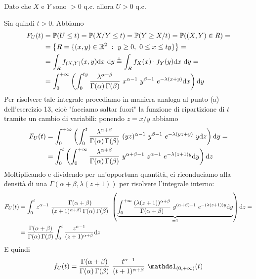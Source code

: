 \Soluzione{}
Dato che $X$ e $Y$ sono $>0$ q.c. allora $U>0$ q.c. 

Sia quindi $t>0$. Abbiamo
\begin{gather*}
\begin{aligned}
F_U(t)&=\PP(U\leq t)=\PP(X/Y\leq t)=\PP(Y\geq X/t)=\PP((X,Y)\in R)=\\
&=\left\{ R=\{(x,y)\in\RR^2\ :\ y\geq 0,\ 0\leq x\leq ty \} \right\}=\\
&=\int_R \fXYxy\dxy\overset{\underset{\indep}{}}{=}\int_R f_X(x)\cdot f_Y(y)\dxy=\\
&=\int_0^{+\infty}\left(\int_0^{ty}\frac{\lambda^{\alpha+\beta}}{\Gamma(\alpha)\,\Gamma(\beta)}\ x^{\alpha-1}\ y^{\beta-1}\ e^{-\lambda(x+y)}\dx\right)\dy
\end{aligned}
\end{gather*}
Per risolvere tale integrale procediamo in maniera analoga al punto (a) dell'esercizio 13, cioè "facciamo saltar fuori" la funzione di ripartizione di $t$ tramite un cambio di variabili: ponendo $z=x/y$ abbiamo
\begin{gather*}
\begin{aligned}
F_U(t)&=\int_0^{+\infty}\left(\int_0^{t}\frac{\lambda^{\alpha+\beta}}{\Gamma(\alpha)\,\Gamma(\beta)}\ (yz)^{\alpha-1}\ y^{\beta-1}\ e^{-\lambda(yz+y)}\ y\dz\right)\dy= \\
&=\int_0^t\left (\int_0^{+\infty}\frac{\lambda^{\alpha+\beta}}{\Gamma(\alpha)\,\Gamma(\beta)}\ y^{\alpha+\beta-1}\ z^{\alpha-1}\ e^{-\lambda(z+1)y}\dy\right)\dz
\end{aligned}
\end{gather*}
Moltiplicando e dividendo per un'opportuna quantità, ci riconduciamo alla densità di una $\Gamma(\alpha+\beta,\lambda(z+1))$ per risolvere l'integrale interno:
\begin{gather*}
\begin{aligned}
F_U(t)&=\int_0^t z^{\alpha-1}\ \frac{\Gamma(\alpha+\beta)}{(z+1)^{\alpha+\beta)}\,\Gamma(\alpha)\,\Gamma(\beta)}\ \left (\underbrace{\int_0^{+\infty}\frac{(\lambda(z+1))^{\alpha+\beta}}{\Gamma(\alpha+\beta)}\ y^{(\alpha+\beta)-1}\ e^{-(\lambda(z+1))y}\dy}_{=1}\right)\dz=\\
&=\frac{\Gamma(\alpha+\beta)}{\Gamma(\alpha)\,\Gamma(\beta)}\int_0^t\frac{z^{\alpha-1}}{(z+1)^{\alpha+\beta}}\dz
\end{aligned}
\end{gather*}
E quindi
\[
f_U(t)=\frac{\Gamma(\alpha+\beta)}{\Gamma(\alpha)\,\Gamma(\beta)}\ \frac{t^{\alpha-1}}{(t+1)^{\alpha+\beta}}\ \Ind_{(0,+\infty)}(t)
\]


